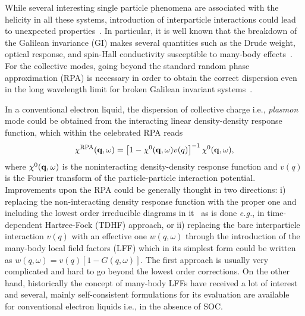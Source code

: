 \documentclass[aps, pra, reprint,superscriptaddress]{revtex4-1}
\def\be{\begin{equation}}
\def\ee{\end{equation}}
\def\qv{{\bf q}}
\begin{document}
While several interesting single particle phenomena are associated with the helicity in all these systems, introduction of interparticle interactions could lead to unexpected properties~\cite{Ghchen1999-1,Ghchen1999-2, Magarill2001, Saraga2005, Dimitrova2005, Wang2005,Pletyukhov2006,Schliemann2006,Chesi2007,Badalyan2009,Ambrosetti2009,Nechaev2010, Badalyan2010,Zak2010,Chesi2011-1,Chesi2011-2,Ashrafi2012,Maiti2015-2}. 
In particular, it is well known that the breakdown of the Galilean invariance (GI) makes several quantities such as the Drude weight, optical response, and spin-Hall conductivity susceptible to many-body effects~\cite{Shekhter,Farid2006,Amit2011,Abedinpour2011,Maiti2015}. 
For the collective modes, going beyond the standard random phase approximation (RPA) is necessary in order to obtain the correct dispersion even in the long wavelength limit for broken Galilean invariant systems~\cite{Abedinpour2011}.

In a conventional electron liquid, the dispersion of collective charge i.e., \textit{plasmon} mode could be obtained from the interacting linear density-density response function, which within the celebrated RPA reads~\cite{GV_book}
\be
\chi^{\rm RPA}(\qv,\omega)=\left[1- \chi^0(\qv,\omega)v(q)\right]^{-1} \chi^0(\qv,\omega),
\ee
where $\chi^0(\qv,\omega)$ is the noninteracting density-density response function and $v(q)$ is the Fourier transform of the particle-particle interaction potential. Improvements upon the RPA could be generally thought in two directions: i) replacing the non-interacting density response function with the proper one and including the lowest order irreducible diagrams in it~\cite{GV_book} as is done \textit{e.g.}, in time-dependent Hartree-Fock (TDHF) approach, or ii) replacing the bare interparticle interaction $v(q)$ with an effective one $w(q,\omega)$ through the introduction of the many-body local field factors (LFF) which in its simplest form could be written as $w(q,\omega)=v(q)[1-G(q,\omega)]$. The first approach is usually very complicated and hard to go beyond the lowest order corrections. On the other hand, historically the concept of many-body LFFs have received a lot of interest and several, mainly self-consistent formulations for its evaluation are available~\cite{GV_book} for conventional electron liquids i.e., in the absence of SOC.
\end{document}
